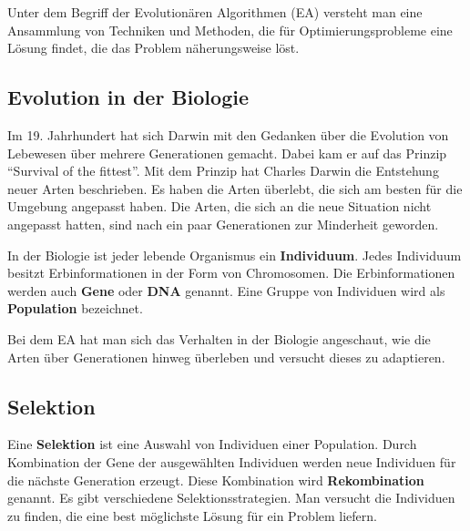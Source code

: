
Unter dem Begriff der Evolution{\"a}ren Algorithmen (EA) versteht man eine Ansammlung von Techniken und Methoden, die f{\"u}r Optimierungsprobleme eine L{\"o}sung findet, die das Problem n{\"a}herungsweise l{\"o}st. \cite{weicker2015evolutionare} 


\subsection{Evolution in der Biologie}
Im 19. Jahrhundert hat sich Darwin mit den Gedanken {\"u}ber die Evolution von Lebewesen {\"u}ber mehrere Generationen gemacht. Dabei kam er auf das Prinzip "`Survival of the fittest"'. Mit dem Prinzip hat Charles Darwin die Entstehung neuer Arten beschrieben. Es haben die Arten {\"u}berlebt, die sich am besten f{\"u}r die Umgebung angepasst haben. Die Arten, die sich an die neue Situation nicht angepasst hatten, sind nach ein paar Generationen zur Minderheit geworden. \cite{hunermann2007brockhaus}

In der Biologie ist jeder lebende Organismus ein \textbf{Individuum}.
Jedes Individuum besitzt Erbinformationen in der Form von Chromosomen. Die Erbinformationen werden auch \textbf{Gene} oder \textbf{DNA} genannt. 
Eine Gruppe von Individuen wird als \textbf{Population} bezeichnet. 

Bei dem EA hat man sich das Verhalten in der Biologie angeschaut, wie die Arten {\"u}ber Generationen hinweg {\"u}berleben und versucht dieses zu adaptieren. \cite{flickevolutionare}

\subsection{Selektion}

Eine \textbf{Selektion} ist eine Auswahl von Individuen einer Population. Durch Kombination der Gene der ausgew{\"a}hlten Individuen werden neue Individuen f{\"u}r die n{\"a}chste Generation erzeugt. Diese Kombination wird \textbf{Rekombination} genannt.
Es gibt verschiedene Selektionsstrategien. Man versucht die Individuen zu finden, die eine best m{\"o}glichste L{\"o}sung f{\"u}r ein Problem liefern. \cite{weicker2015evolutionare, flickevolutionare}

